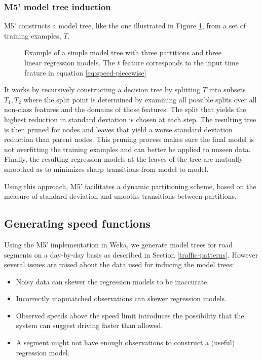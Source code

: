 \subsubsection{M5' model tree induction}
M5' constructs a model tree, like the one illustrated in Figure \ref{fig:model-tree}, from a set of training examples, $T$.
\begin{figure}[H]
	\centering
	\caption{Example of a simple model tree with three partitions and three linear regression models. The $t$ feature corresponds to the input time feature in equation \ref{eq:speed-piecewise}}
	\label{fig:model-tree}
\end{figure}
It works by recursively constructing a decision tree by splitting $T$ into subsets $T_1,T_2$ where the split point is determined by examining all possible splits over all non-class features and the domains of those features. The split that yields the highest reduction in standard deviation is chosen at each step.
The resulting tree is then pruned for nodes and leaves that yield a worse standard deviation reduction than parent nodes. This pruning process makes sure the final model is not overfitting the training examples and can better be applied to unseen data. 
Finally, the resulting regression models at the leaves of the tree are mutually smoothed as to minimizes sharp transitions from model to model.

Using this approach, M5' facilitates a dynamic partitioning scheme, based on the measure of standard deviation and smooths transitions between partitions.

\subsection{Generating speed functions}
Using the M5' implementation in Weka, we generate model trees for road segments on a day-by-day basis as described in Section \ref{traffic-patterns}. However several issues are raised about the data used for inducing the model trees:
\begin{itemize}
\item Noisy data can skewer the regression models to be inaccurate.
\item Incorrectly mapmatched observations can skewer regression models.
\item Observed speeds above the speed limit introduces the possibility that the system can suggest driving faster than allowed.
\item A segment might not have enough observations to construct a (useful) regression model.
\end{itemize}
